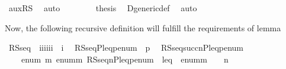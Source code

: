 \begin{isabellebody}
\ aux{\isacharunderscore}{\kern0pt}RS{}\ \isamarkupfalse%
\ auto\isanewline
\ \ \isamarkupfalse%
\ \isanewline
\ \ \isamarkupfalse%
\ {\isacharquery}{\kern0pt}thesis\ \isamarkupfalse%
\ D{\isacharunderscore}{\kern0pt}generic{\isacharunderscore}{\kern0pt}def\ \isamarkupfalse%
\ auto\isanewline
{}\isamarkupfalse%
%
\endisatagproof
{\isafoldproof}%
%
\isadelimproof
\isanewline
%
\endisadelimproof
\isanewline
{}\isamarkupfalse%
%
\begin{isamarkuptext}%
Now, the following recursive definition will fulfill the 
requirements of lemma %
\end{isamarkuptext}\isamarkuptrue%
\isamarkupfalse%
\ RS{\isacharunderscore}{\kern0pt}seq\ {\isacharcolon}{\kern0pt}{\isacharcolon}{\kern0pt}\ {\isachardoublequoteopen}{\isacharbrackleft}{\kern0pt}i{\isacharcomma}{\kern0pt}i{\isacharcomma}{\kern0pt}i{\isacharcomma}{\kern0pt}i{\isacharcomma}{\kern0pt}i{\isacharcomma}{\kern0pt}i{\isacharbrackright}{\kern0pt}\ {\isasymRightarrow}\ i{\isachardoublequoteclose}\isanewline
{}\isamarkupfalse%
\isanewline
\ \ {\isachardoublequoteopen}RS{\isacharunderscore}{\kern0pt}seq{\isacharparenleft}{\kern0pt}{}{\isacharcomma}{\kern0pt}P{\isacharcomma}{\kern0pt}leq{\isacharcomma}{\kern0pt}p{\isacharcomma}{\kern0pt}enum{\isacharcomma}{\kern0pt}{\isasymD}{\isacharparenright}{\kern0pt}\ {\isacharequal}{\kern0pt}\ p{\isachardoublequoteclose}\isanewline
\ \ {\isachardoublequoteopen}RS{\isacharunderscore}{\kern0pt}seq{\isacharparenleft}{\kern0pt}succ{\isacharparenleft}{\kern0pt}n{\isacharparenright}{\kern0pt}{\isacharcomma}{\kern0pt}P{\isacharcomma}{\kern0pt}leq{\isacharcomma}{\kern0pt}p{\isacharcomma}{\kern0pt}enum{\isacharcomma}{\kern0pt}{\isasymD}{\isacharparenright}{\kern0pt}\ {\isacharequal}{\kern0pt}\ \isanewline
\ \ \ \ enum{\isacharbackquote}{\kern0pt}{\isacharparenleft}{\kern0pt}{\isasymmu}\ m{\isachardot}{\kern0pt}\ {\isasymlangle}enum{\isacharbackquote}{\kern0pt}m{\isacharcomma}{\kern0pt}\ RS{\isacharunderscore}{\kern0pt}seq{\isacharparenleft}{\kern0pt}n{\isacharcomma}{\kern0pt}P{\isacharcomma}{\kern0pt}leq{\isacharcomma}{\kern0pt}p{\isacharcomma}{\kern0pt}enum{\isacharcomma}{\kern0pt}{\isasymD}{\isacharparenright}{\kern0pt}{\isasymrangle}\ {\isasymin}\ leq\ {\isasymand}\ enum{\isacharbackquote}{\kern0pt}m\ {\isasymin}\ {\isasymD}\ {\isacharbackquote}{\kern0pt}\ n{\isacharparenright}{\kern0pt}{\isachardoublequoteclose}\isanewline

\end{isabellebody}
